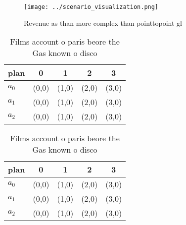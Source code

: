 \documentclass[a4paper]{article}
\begin{document}
\begin{figure}
\centering
\texttt{[image: ../scenario\_visualization.png]}
\caption{Revenue as than more complex than pointtopoint gl
}
\end{figure}
 
\begin{table}
\begin{adjustbox}{width=0.6\columnwidth}
\begin{tabular}{|l|l|l|l|l|}
\hline
\textbf{plan} & \multicolumn{1}{c|}{\textbf{0}} & \multicolumn{1}{c|}{\textbf{1}} & \multicolumn{1}{c|}{\textbf{2}} & \multicolumn{1}{c|}{\textbf{3}} \\ \hline
\textbf{$a_0$}  & (0,0) & (1,0) & (2,0) & (3,0) \\ \hline
\textbf{$a_1$}  & (0,0) & (1,0) & (2,0) & (3,0) \\ \hline
\textbf{$a_2$}  & (0,0) & (1,0) & (2,0) & (3,0) \\ \hline
\end{tabular}
\end{adjustbox}
\caption{Films account o paris beore the Gas known o disco
}
\end{table}

\begin{table}
\begin{adjustbox}{width=0.6\columnwidth}
\begin{tabular}{|l|l|l|l|l|}
\hline
\textbf{plan} & \multicolumn{1}{c|}{\textbf{0}} & \multicolumn{1}{c|}{\textbf{1}} & \multicolumn{1}{c|}{\textbf{2}} & \multicolumn{1}{c|}{\textbf{3}} \\ \hline
\textbf{$a_0$}  & (0,0) & (1,0) & (2,0) & (3,0) \\ \hline
\textbf{$a_1$}  & (0,0) & (1,0) & (2,0) & (3,0) \\ \hline
\textbf{$a_2$}  & (0,0) & (1,0) & (2,0) & (3,0) \\ \hline
\end{tabular}
\end{adjustbox}
\caption{Films account o paris beore the Gas known o disco
}
\end{table}
\end{document}
